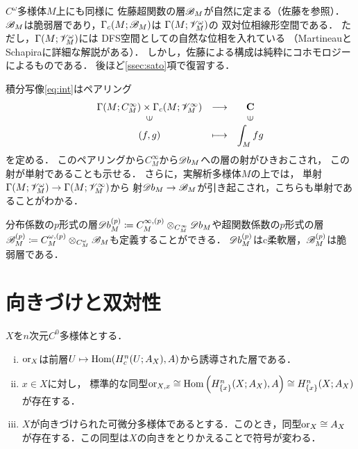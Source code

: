 \(C^\omega\)多様体\(M\)上にも同様に
佐藤超関数の層\(\mathscr{B}_M\)が自然に定まる（佐藤\cite{Sa59}を参照）．
\(\mathscr{B}_M\)は脆弱層であり，\(\Gamma_c(M;\mathscr{B}_M)\)は
\(\Gamma(M;\mathscr{V}_M^\omega)\)の
双対位相線形空間である．
ただし，\(\Gamma(M;\mathscr{V}_M^\omega)\)には
DFS空間としての自然な位相を入れている
（MartineauとSchapiraに詳細な解説がある）．
しかし，佐藤による構成は純粋にコホモロジーによるものである．
後ほど\ref{ssec:sato}項で復習する．

積分写像\eqref{eq:int}はペアリング
\begin{equation}
    \begin{array}{ccc}
        {\Gamma(M;C_M^\infty)\times\Gamma_c(M;\scV_M^\infty)}&\longrightarrow&\cc\\
        \rotatebox{90}{$\in$}&&\rotatebox{90}{$\in$}\\
        (f,g)&\longmapsto&\dip\int_Mfg
    \end{array}
\end{equation}
を定める．
このペアリングから\(C^\infty_M\)から\(\mathord{\mathscr{D}b}_M\)への層の射がひきおこされ，
この射が単射であることも示せる．
さらに，実解析多様体\(M\)の上では，
単射\(\Gamma(M;\mathscr{V}_M^\omega)\to\Gamma(M;\mathscr{V}_M^\infty)\)から
射\(\mathord{\mathscr{D}b}_M\to\mathscr{B}_M\)が引き起こされ，こちらも単射であることがわかる．

分布係数の\(p\)形式の層\(
    \mathord{\mathscr{D}b}_M^{(p)}
    \coloneqq 
    C^{\infty,(p)}_M\otimes_{C^\infty_M}\mathord{\mathscr{D}b}_M
\)や超関数係数の\(p\)形式の層\(
    \mathscr{B}_M^{(p)}
    \coloneqq 
    C^{\omega,(p)}_M\otimes_{C^\omega_M}\mathscr{B}_M
\)も定義することができる．
\(\mathord{\mathscr{D}b}_M^{(p)}\)はc柔軟層，\(\mathscr{B}_M^{(p)}\)は脆弱層である．

\section{向きづけと双対性{\cite[3.3]{KS90}}}

\begin{leftbar}
\begin{PRP}[{\cite[Prop3.3.6]{KS90}}]
    \(X\)を\(n\)次元\(C^0\)多様体とする．
    \begin{enumerate}[(i)]
        \item \(\mathord{\mathrm{or}}_X\)は前層\(U\mapsto\mathop{\mathrm{Hom}}\nolimits(H^n_c(U;A_X),A)\)から誘導された層である．
        \item \(x\in X\)に対し，
        標準的な同型\(
            \mathord{\mathrm{or}}_{X,x}
            \cong\mathop{\mathrm{Hom}}\nolimits\left(H^n_{\{x\}}(X;A_X),A\right)
            \cong H^n_{\{x\}}(X;A_X)
        \)が存在する．
        \item \(X\)が向きづけられた可微分多様体であるとする．このとき，同型\(\mathord{\mathrm{or}}_X\cong A_X\)が存在する．この同型は\(X\)の向きをとりかえることで符号が変わる．
    \end{enumerate}
\end{PRP}
\end{leftbar}

